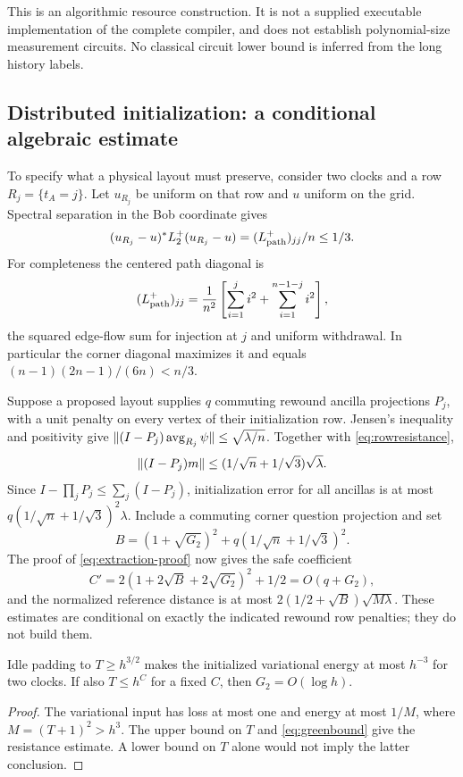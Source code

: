 This is an algorithmic resource construction. It is not a supplied
executable implementation of the complete compiler, and does not
establish polynomial-size measurement circuits. No classical circuit
lower bound is inferred from the long history labels.

\subsection{Distributed initialization: a conditional algebraic estimate}
To specify what a physical layout must preserve, consider two clocks
and a row $R_j=\{t_A=j\}$. Let $u_{R_j}$ be uniform on that row and
$u$ uniform on the grid. Spectral separation in the Bob coordinate gives
\begin{equation}\label{eq:rowresistance}
 (u_{R_j}-u)^*L_2^+(u_{R_j}-u)
       =(L_{
       \rm path}^+)_{jj}/n\leq1/3.
\end{equation}
For completeness the centered path diagonal is
\[
 (L_{\rm path}^+)_{jj}
 =\frac1{n^2}\left[\sum_{i=1}^{j}i^2+\sum_{i=1}^{n-1-j}i^2\right],
\]
the squared edge-flow sum for injection at $j$ and uniform withdrawal.
In particular the corner diagonal maximizes it and equals
$(n-1)(2n-1)/(6n)<n/3$.

Suppose a proposed layout supplies $q$ commuting rewound ancilla
projections $P_j$, with a unit penalty on every vertex of their
initialization row. Jensen's inequality and positivity give
$\lVert(I-P_j)\operatorname{avg}_{R_j}\psi\rVert\leq\sqrt{\lambda/n}$.
Together with \eqref{eq:rowresistance},
\[
 \lVert(I-P_j)m\rVert\leq(1/\sqrt n+1/\sqrt3)\sqrt\lambda.
\]
Since $I-\prod_jP_j\leq\sum_j(I-P_j)$, initialization error for all
ancillas is at most $q(1/\sqrt n+1/\sqrt3)^2\lambda$. Include a
commuting corner question projection and set
\[
 B=(1+\sqrt{G_2})^2+q(1/\sqrt n+1/\sqrt3)^2.
\]
The proof of \eqref{eq:extraction-proof} now gives the safe coefficient
\begin{equation}\label{eq:rowconstant}
 C'=2(1+2\sqrt B+2\sqrt{G_2})^2+1/2=O(q+G_2),
\end{equation}
and the normalized reference distance is at most
$2(1/2+\sqrt B)\sqrt{M\lambda}$. These estimates are conditional
on exactly the indicated rewound row penalties; they do not build them.

\begin{lemma}[Padding]\label{lem:padding}
Idle padding to $T\geq h^{3/2}$ makes the initialized variational
energy at most $h^{-3}$ for two clocks. If also $T\leq h^C$ for a
fixed $C$, then $G_2=O(\log h)$.
\end{lemma}
\begin{proof}
The variational input has loss at most one and energy at most $1/M$,
where $M=(T+1)^2>h^3$. The upper bound on $T$ and
\eqref{eq:greenbound} give the resistance estimate. A lower bound
on $T$ alone would not imply the latter conclusion.
\end{proof}
